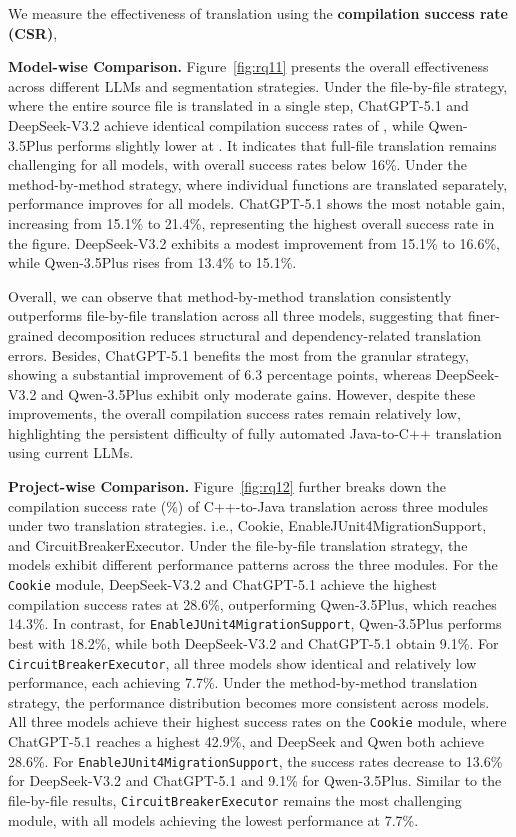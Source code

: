 We measure the effectiveness of translation using the \textbf{compilation success rate (CSR)}, 



\textbf{Model-wise Comparison.} Figure~\ref{fig:rq11} presents the overall effectiveness across different LLMs and segmentation strategies. Under the file-by-file strategy, where the entire source file is translated in a single step, ChatGPT-5.1 and DeepSeek-V3.2 achieve identical compilation success rates of , while Qwen-3.5Plus performs slightly lower at . It indicates that full-file translation remains challenging for all models, with overall success rates below 16\%. Under the method-by-method strategy, where individual functions are translated separately, performance improves for all models. ChatGPT-5.1 shows the most notable gain, increasing from 15.1\% to 21.4\%, representing the highest overall success rate in the figure. DeepSeek-V3.2 exhibits a modest improvement from 15.1\% to 16.6\%, while Qwen-3.5Plus rises from 13.4\% to 15.1\%.


Overall, we can observe that method-by-method translation consistently outperforms file-by-file translation across all three models, suggesting that finer-grained decomposition reduces structural and dependency-related translation errors. Besides, ChatGPT-5.1 benefits the most from the granular strategy, showing a substantial improvement of 6.3 percentage points, whereas DeepSeek-V3.2 and Qwen-3.5Plus exhibit only moderate gains. However, despite these improvements, the overall compilation success rates remain relatively low, highlighting the persistent difficulty of fully automated Java-to-C++ translation using current LLMs.

\textbf{Project-wise Comparison.} Figure~\ref{fig:rq12} further breaks down the compilation success rate (\%) of C++-to-Java translation across three modules under two translation strategies. i.e., Cookie, EnableJUnit4MigrationSupport, and CircuitBreakerExecutor. Under the file-by-file translation strategy, the models exhibit different performance patterns across the three modules. For the \texttt{Cookie} module, DeepSeek-V3.2 and ChatGPT-5.1 achieve the highest compilation success rates at 28.6\%, outperforming Qwen-3.5Plus, which reaches 14.3\%. In contrast, for \texttt{EnableJUnit4MigrationSupport}, Qwen-3.5Plus performs best with 18.2\%, while both DeepSeek-V3.2 and ChatGPT-5.1 obtain 9.1\%. For \texttt{CircuitBreakerExecutor}, all three models show identical and relatively low performance, each achieving 7.7\%. Under the method-by-method translation strategy, the performance distribution becomes more consistent across models. All three models achieve their highest success rates on the \texttt{Cookie} module, where ChatGPT-5.1 reaches a highest 42.9\%, and DeepSeek and Qwen both achieve 28.6\%. For \texttt{EnableJUnit4MigrationSupport}, the success rates decrease to 13.6\% for DeepSeek-V3.2 and ChatGPT-5.1 and 9.1\% for Qwen-3.5Plus. Similar to the file-by-file results, \texttt{CircuitBreakerExecutor} remains the most challenging module, with all models achieving the lowest performance at 7.7\%.


